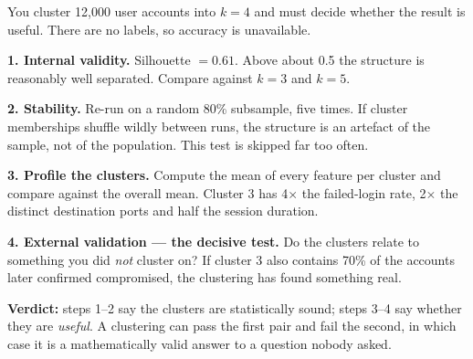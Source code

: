 \begin{worked}
You cluster 12{,}000 user accounts into $k=4$ and must decide whether the result is
useful. There are no labels, so accuracy is unavailable.

\smallskip
\textbf{1. Internal validity.} Silhouette $= 0.61$. Above about 0.5 the structure is
reasonably well separated. Compare against $k=3$ and $k=5$.

\textbf{2. Stability.} Re-run on a random 80\% subsample, five times. If cluster
memberships shuffle wildly between runs, the structure is an artefact of the
sample, not of the population. This test is skipped far too often.

\textbf{3. Profile the clusters.} Compute the mean of every feature per cluster and
compare against the overall mean. Cluster 3 has 4$\times$ the failed-login rate,
2$\times$ the distinct destination ports and half the session duration.

\textbf{4. External validation --- the decisive test.} Do the clusters relate to
something you did \emph{not} cluster on? If cluster 3 also contains 70\% of the
accounts later confirmed compromised, the clustering has found something real.

\smallskip
\textbf{Verdict:} steps 1--2 say the clusters are statistically sound; steps 3--4
say whether they are \emph{useful}. A clustering can pass the first pair and fail
the second, in which case it is a mathematically valid answer to a question nobody
asked.
\end{worked}

